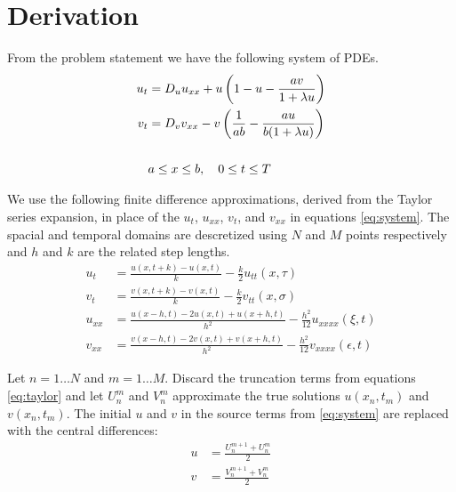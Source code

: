 \section{Derivation}

From the problem statement we have the following system of PDEs.
\begin{subequations} \label{eq:system}
\begin{align}
    u_t &= D_u u_{xx} + u \left( 1 - u - \frac{av}{1+\lambda u} \right) \label{eq:prey} \\
    v_t &= D_v v_{xx} - v \left( \frac{1}{ab} - \frac{au}{b(1+\lambda u)} \right) \label{eq:pred} \\
    \notag\\
        &  a \leq x \leq b, \quad 0 \leq t \leq T \notag
\end{align}
\end{subequations}

We use the following finite difference approximations, derived from the Taylor
series expansion, in place of the $u_t$, $u_{xx}$, $v_t$, and $v_{xx}$ in
equations \eqref{eq:system}. The spacial and temporal domains are descretized
using $N$ and $M$ points respectively and $h$ and $k$ are the related step
lengths.
\begin{subequations} \label{eq:taylor}
\begin{align}
    u_t &= \frac{u(x,t+k)-u(x,t)}{k} - \frac{k}{2} u_{tt}(x,\tau) \label{eq:u_t}
    \\
    v_t &= \frac{v(x,t+k)-v(x,t)}{k} - \frac{k}{2} v_{tt}(x,\sigma) \label{eq:v_t}
    \\
    u_{xx} &= \frac{u(x-h,t)-2u(x,t)+u(x+h,t)}{h^2} -
        \frac{h^2}{12} u_{xxxx}(\xi,t) \label{eq:u_xx}
    \\
    v_{xx} &= \frac{v(x-h,t)-2v(x,t)+v(x+h,t)}{h^2} -
        \frac{h^2}{12} v_{xxxx}(\epsilon,t) \label{eq:v_xx}
\end{align}
\end{subequations}

Let $n = 1 \dots N$ and $m = 1 \dots M$. Discard the truncation terms from
equations \eqref{eq:taylor} and let $U_n^m$ and $V_n^m$ approximate the true
solutions $u(x_n,t_m)$ and $v(x_n,t_m)$. The initial $u$ and $v$ in the source
terms from \eqref{eq:system} are replaced with the central differences:
\begin{subequations} \label{eq:source_term_approx}
\begin{align}
    u &= \frac{U_n^{m+1} + U_n^m}{2} \\
    v &= \frac{V_n^{m+1} + V_n^m}{2}
\end{align}
\end{subequations}

